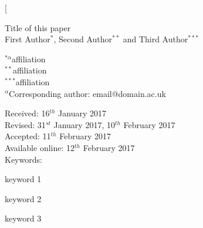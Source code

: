 \documentclass[paper=a4,fontsize=11pt,twocolumn]{article}
\begin{document}
\pagestyle{fancy}

\twocolumn[

	\begin{@twocolumnfalse}	

		\huge\textcolor{brand-secondary}{Title of this paper}\\	
		
		\Large{First Author$^{*}$, Second Author$^{**}$ and Third Author$^{***}$}	

		\setlength{\columnseprule}{1pt}
		\def\columnseprulecolor{\color{brand-secondary}}
		\begin{multicols}{2}
			\small{$^{*\alpha}$affiliation\smallskip\\
				$^{**}$affiliation\smallskip\\
				$^{***}$affiliation}\bigskip\smallskip\\
			\vfill
			\small{$^{\alpha}$Corresponding author: email@domain.ac.uk}
			\columnbreak

			\hangindent=0.8cm 
			\small{
				\hspace{8mm}Received: 16$^{th}$ January 2017\smallskip\\
				Revised: 31$^{st}$ January 2017, 10$^{th}$ February 2017\smallskip\\
				Accepted: 11$^{th}$ February 2017\smallskip\\
				Available online: 12$^{th}$ February 2017\bigskip\\
				\vfill
				\hspace{8mm}Keywords: \colorbox{brand-midlight}{\strut keyword 1} \colorbox{brand-midlight}{\strut keyword 2} \colorbox{brand-midlight}{\strut keyword 3}
				}
		\end{multicols}
		\bigskip		


\end{@twocolumnfalse}
\end{document}
